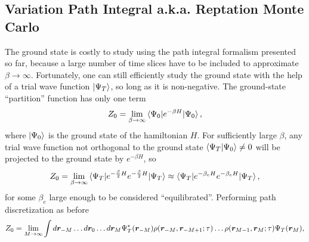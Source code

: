 \subsection{Variation Path Integral a.k.a. Reptation Monte Carlo}
The ground state is costly to study using the path integral formalism presented so far, because a large number of time slices have to be included to approximate $\beta\rightarrow\infty$. Fortunately, one can still efficiently study the ground state with the help of a trial wave function $\ket{\Psi_T}$, so long as it is non-negative. The ground-state ``partition'' function has only one term
\begin{align}
Z_0 = \lim\limits_{\beta\rightarrow\infty} \braket{\Psi_0|e^{-\beta H}|\Psi_0},
\end{align}
where $\ket{\Psi_0}$ is the ground state of the hamiltonian $H$.
For sufficiently large $\beta$, any trial wave function not orthogonal to the ground state $\braket{\Psi_T|\Psi_0}\neq0$ will be projected to the ground state by $e^{-\beta H}$, so
\begin{align} \label{eq:rmc-z0}
Z_0 = \lim\limits_{\beta\rightarrow\infty}\braket{\Psi_T|e^{-\frac{\beta}{2} H}e^{-\frac{\beta}{2} H}|\Psi_T} \approx \braket{\Psi_T|e^{-\beta_e H}e^{-\beta_e H}|\Psi_T},
\end{align}
for some $\beta_e$ large enough to be considered ``equilibrated''. Performing path discretization as before
\begin{align} \label{eq:pimc-vpi-z0}
Z_0 = \lim\limits_{M\rightarrow\infty} \int d\boldsymbol{r}_{-M}\dots d\boldsymbol{r}_0\dots d\boldsymbol{r}_{M}
\Psi_T^*(\boldsymbol{r}_{-M})\rho(\boldsymbol{r}_{-M},\boldsymbol{r}_{-M+1};\tau)\dots\rho(\boldsymbol{r}_{M-1},\boldsymbol{r}_M;\tau)\Psi_T(\boldsymbol{r}_M),
\end{align}
